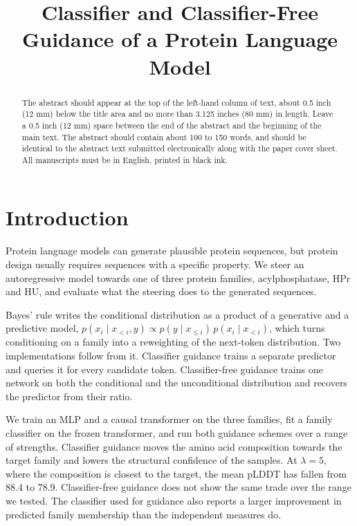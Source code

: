 \documentclass{article}
\title{Classifier and Classifier-Free Guidance of a Protein Language Model}
\begin{document}
\maketitle

\begin{abstract}
  The abstract should appear at the top of the left-hand column of text, about 0.5 inch (12 mm) below the title area and no more than 3.125 inches (80 mm) in length. Leave a 0.5 inch (12 mm) space between the end of the abstract and the beginning of the main text. The abstract should contain about 100 to 150 words, and should be identical to the abstract text submitted electronically along with the paper cover sheet. All manuscripts must be in English, printed in black ink.
\end{abstract}

\section{Introduction}
\label{sec:intro}

Protein language models can generate plausible protein sequences, but protein design usually requires sequences with a specific property.
We steer an autoregressive model towards one of three protein families, acylphosphatase, HPr and HU, and evaluate what the steering does to the generated sequences.

Bayes' rule writes the conditional distribution as a product of a generative and a predictive model, $p(x_i \mid x_{<i}, y) \propto p(y \mid x_{\leq i})\, p(x_i \mid x_{<i})$, which turns conditioning on a family into a reweighting of the next-token distribution.
Two implementations follow from it.
Classifier guidance trains a separate predictor and queries it for every candidate token.
Classifier-free guidance trains one network on both the conditional and the unconditional distribution and recovers the predictor from their ratio.

We train an MLP and a causal transformer on the three families, fit a family classifier on the frozen transformer, and run both guidance schemes over a range of strengths.
Classifier guidance moves the amino acid composition towards the target family and lowers the structural confidence of the samples.
At $\lambda = 5$, where the composition is closest to the target, the mean pLDDT has fallen from 88.4 to 78.9.
Classifier-free guidance does not show the same trade over the range we tested.
The classifier used for guidance also reports a larger improvement in predicted family membership than the independent measures do.
\end{document}

